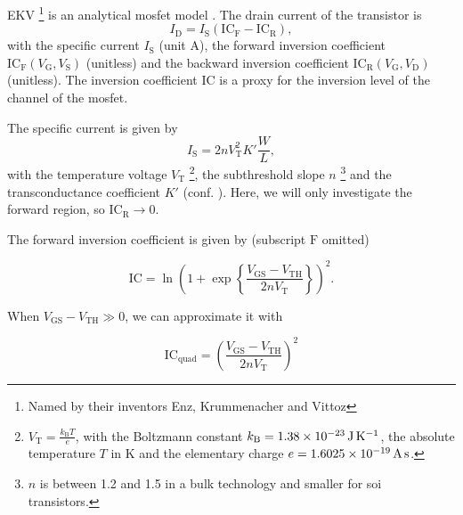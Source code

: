 \documentclass{article}[11pt]
\begin{document}
\notetitle

EKV%
\footnote{Named by their inventors Enz, Krummenacher and Vittoz}
is an analytical \gls{mosfet} model \cite{enz-ekv-90}.
The drain current of the transistor is
\begin{equation}
I_{\mathrm{D}} = I_{\mathrm{S}} \left(\mathrm{IC}_{\mathrm{F}}-\mathrm{IC}_{\mathrm{R}}\right),
\end{equation}
with the specific current $I_{\mathrm{S}}$ (unit A), the forward 
inversion coefficient 
$\mathrm{IC}_{\mathrm{F}}(V_{\mathrm{G}}, V_{\mathrm{S}})$ (unitless) and 
the backward inversion coefficient 
$\mathrm{IC}_{\mathrm{R}}(V_{\mathrm{G}}, V_{\mathrm{D}})$ (unitless).
The inversion coefficient $\mathrm{IC}$ is a proxy for the inversion level of 
the channel of the \gls{mosfet}.

\medskip

The specific current is given by
\begin{equation}
  I_{\mathrm{S}} = 2 n V_{\mathrm{T}}^2 K' \frac{W}{L},
\end{equation}
with the temperature voltage $V_{\mathrm{T}}$%
\footnote{$V_{\mathrm{T}}=\frac{k_{\mathrm{B}} T }{e}$, with the 
Boltzmann constant $k_{\mathrm{B}}=\SI{1.38d-23}{\joule\per\kelvin}$, 
the absolute temperature $T$ in \si{\kelvin} and the 
elementary charge $e=\SI{1.6025d-19}{\ampere\second}$.},
the subthreshold slope $n$%
\footnote{$n$ is between 1.2 and 1.5 in a bulk technology and smaller 
for \gls{soi} transistors\cite{jespers-gmid-17}.}
 and the transconductance coefficient $K'$ 
(conf. \cite{mosfet-square-law}).
Here, we will only investigate the forward region, so 
$\mathrm{IC}_{\mathrm{R}} \rightarrow 0$.

\bigskip

The forward inversion coefficient is given by 
(subscript $\mathrm{F}$ omitted)

\begin{equation}\label{eq:ic}
  \mathrm{IC} = \ln\left(1+\exp\left\{\frac{V_{\mathrm{GS}}-V_{\mathrm{TH}}}{2 n V_{\mathrm{T}}}\right\}\right)^2.
\end{equation}


When $V_{\mathrm{GS}}-V_{\mathrm{TH}} \gg 0$, we can approximate 
it with

\begin{equation}\label{eq:ic-quad}
  \mathrm{IC}_{\mathrm{quad}} = \left(\frac{V_{\mathrm{GS}}-V_{\mathrm{TH}}}{2 n V_{\mathrm{T}}}\right)^2
\end{equation}
\end{document}
